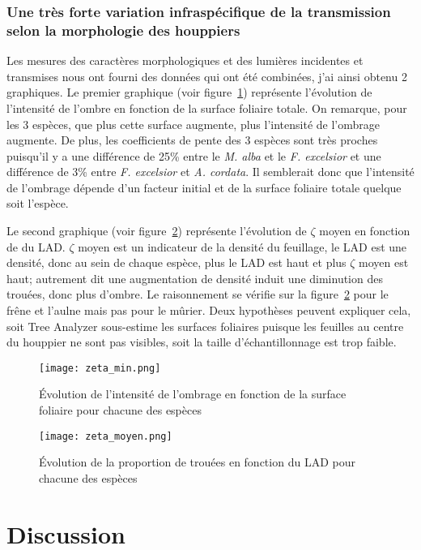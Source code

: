 \documentclass[12pt]{report}
\begin{document}
\subsection{Une très forte variation infraspécifique de la transmission selon la
  morphologie des houppiers }

Les mesures des caractères morphologiques et des lumières incidentes et
transmises nous ont fourni des données qui ont été combinées, j'ai ainsi obtenu
2 graphiques. Le premier graphique (voir figure~\ref{fig:zeta_min}) représente
l'évolution de l'intensité de l'ombre en fonction de la surface foliaire totale.
On remarque, pour les 3 espèces, que plus cette surface augmente, plus
l'intensité de l'ombrage augmente. De plus, les coefficients de pente des 3
espèces sont très proches puisqu'il y a une différence de 25\% entre le
\textit{M. alba} et le \textit{F. excelsior} et une différence de 3\% entre
\textit{F. excelsior} et \textit{A. cordata}. Il semblerait donc que l'intensité
de l'ombrage dépende d'un facteur initial et de la surface foliaire totale
quelque soit l'espèce.

Le second graphique (voir figure~\ref{fig:zeta_moyen}) représente l'évolution de $\zeta$
moyen en fonction de du LAD. $\zeta$ moyen est un indicateur de la densité du
feuillage, le LAD est une densité, donc au sein de chaque espèce, plus le LAD
est haut et plus $\zeta$ moyen est haut; autrement dit une augmentation de densité
induit une diminution des trouées, donc plus d'ombre. Le raisonnement se vérifie sur la
figure~\ref{fig:zeta_moyen} pour le frêne et l'aulne mais pas pour le mûrier. Deux
hypothèses peuvent expliquer cela, soit Tree Analyzer sous-estime les
surfaces foliaires puisque les feuilles au centre du houppier ne sont pas
visibles, soit la taille d'échantillonnage est trop faible.

\begin{figure}
  \centering
  \texttt{[image: zeta\_min.png]}
  \caption{Évolution de l'intensité de l'ombrage en fonction de la surface
    foliaire pour chacune des espèces\label{fig:zeta_min}}
\end{figure}

\begin{figure}
  \centering
  \texttt{[image: zeta\_moyen.png]}
  \caption{Évolution de la proportion de trouées en fonction du LAD pour chacune
    des espèces\label{fig:zeta_moyen}}
\end{figure}


\chapter{Discussion}
\end{document}
